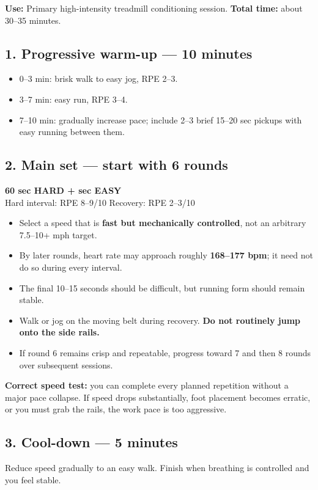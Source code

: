 \documentclass[11pt]{article}
\begin{document}
\textbf{Use:} Primary high-intensity treadmill conditioning session. \textbf{Total time:} about 30--35 minutes.

\subsection{1. Progressive warm-up --- 10 minutes}
\begin{itemize}
\item 0--3 min: brisk walk to easy jog, RPE 2--3.
\item 3--7 min: easy run, RPE 3--4.
\item 7--10 min: gradually increase pace; include 2--3 brief 15--20 sec pickups with easy running between them.
\end{itemize}

\subsection{2. Main set --- start with 6 rounds}
\begin{tcolorbox}[colback=white,colframe=accent,boxrule=1pt,arc=2mm]
\centering
{\Large\bfseries 60 sec HARD \quad +  sec EASY}\\[3pt]
Hard interval: RPE 8--9/10 \qquad Recovery: RPE 2--3/10
\end{tcolorbox}

\begin{itemize}
\item Select a speed that is \textbf{fast but mechanically controlled}, not an arbitrary 7.5--10+ mph target.
\item By later rounds, heart rate may approach roughly \textbf{168--177 bpm}; it need not do so during every interval.
\item The final 10--15 seconds should be difficult, but running form should remain stable.
\item Walk or jog on the moving belt during recovery. \textbf{Do not routinely jump onto the side rails.}
\item If round 6 remains crisp and repeatable, progress toward 7 and then 8 rounds over subsequent sessions.
\end{itemize}

\textbf{Correct speed test:} you can complete every planned repetition without a major pace collapse. If speed drops substantially, foot placement becomes erratic, or you must grab the rails, the work pace is too aggressive.

\subsection{3. Cool-down --- 5 minutes}
Reduce speed gradually to an easy walk. Finish when breathing is controlled and you feel stable.
\end{document}
